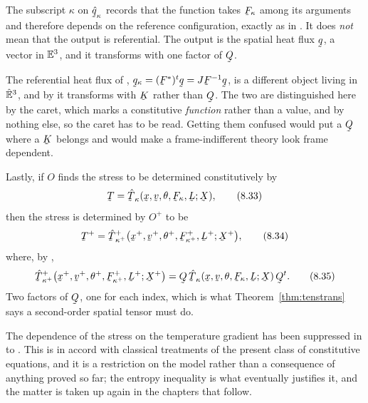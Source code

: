 \begin{remark}
\label{rem:ch8qwarn}
The subscript $\kappa$ on $\hat\bq_{\kappa}$ records that the function
takes $\bF_{\kappa}$ among its arguments and therefore depends on the
reference configuration, exactly as in . It does \emph{not}
mean that the output is referential. The output is the spatial heat flux
$\bq$, a vector in $\mathbb{E}^{3}$, and it transforms with one factor of $\bQ$.

The referential heat flux of , $\bq_{\kappa}=(\bF^{*})^{t}
\bq=J\bF^{-1}\bq$, is a different object living in $\hat{\mathbb{E}}^{3}$, and by
 it transforms with $\bK$ rather than $\bQ$. The two are
distinguished here by the caret, which marks a constitutive
\emph{function} rather than a value, and by nothing else, so the caret
has to be read. Getting them confused would put a $\bQ$ where a $\bK$
belongs and would make a frame-indifferent theory look frame dependent.
\end{remark}

Lastly, if $O$ finds the stress to be determined constitutively by
\begin{equation}
   \bT=\hat\bT_{\kappa}(\bx,\bv,\theta,\bF_{\kappa},\bL;\bX),
   \tag{8.33}\label{eq:8.33}
\end{equation}
then the stress is determined by $O^{+}$ to be
\begin{equation}
   \bT^{+}=\hat\bT^{+}_{\kappa^{+}}\big(\bx^{+},\bv^{+},\theta^{+},
     \bF^{+}_{\kappa^{+}},\bL^{+};\bX^{+}\big),
   \tag{8.34}\label{eq:8.34}
\end{equation}
where, by ,
\begin{equation}
   \hat\bT^{+}_{\kappa^{+}}\big(\bx^{+},\bv^{+},\theta^{+},
     \bF^{+}_{\kappa^{+}},\bL^{+};\bX^{+}\big)
   =\bQ\,\hat\bT_{\kappa}(\bx,\bv,\theta,\bF_{\kappa},\bL;\bX)\,\bQ^{t}.
   \tag{8.35}\label{eq:8.35}
\end{equation}
Two factors of $\bQ$, one for each index, which is what
Theorem~\ref{thm:tenstrans} says a second-order spatial tensor must do.

The dependence of the stress on the temperature gradient has been
suppressed in  to . This is in accord with classical
treatments of the present class of constitutive equations, and it is a
restriction on the model rather than a consequence of anything proved so
far; the entropy inequality is what eventually justifies it, and the
matter is taken up again in the chapters that follow.

